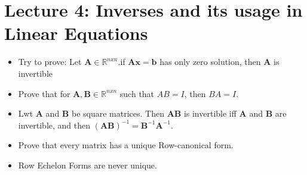 \documentclass{article}
\begin{document}
\section {Lecture 4: Inverses and its usage in Linear Equations}
\begin{itemize}
  \item Try to prove: Let $\mathbf{A} \in \mathbb{R}^{nxn}.$if $\mathbf{Ax = b}$ has only zero solution, then $\mathbf{A}$ is invertible
  \item Prove that for $\mathbf{A, B} \in \mathbb{R}^{nxn}$ such that $AB = I$, then $BA = I$.
  \item Lwt \textbf{A} and \textbf{B} be square matrices. Then \textbf{AB} is invertible iff \textbf{A} and \textbf{B} are invertible, and then $\mathbf{(AB)}^{-1} = \mathbf{B}^{-1}\mathbf{A}^{-1}.$

  \item Prove that every matrix has a unique Row-canonical form.
  \item Row Echelon Forms are never unique.

\end{itemize}
\end{document}
